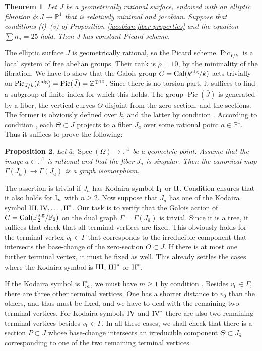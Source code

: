 \documentclass[oneside, 12pt]{amsart}
\newcommand\mylabel[1]{\label{#1}\marginpar{\vspace{-1ex}\medskip\medskip\footnotesize \tt #1}}
\renewcommand\mylabel[1]{\label{#1}}
\newtheorem{theorem}{Theorem}[section]
\newtheorem{proposition}[theorem]{Proposition}
\theoremstyle{definition}
\theoremstyle{remark}
\newcommand{\ZZ}{\mathbb{Z}}
\newcommand{\FF}{\mathbb{F}}
\newcommand{\PP}{\mathbb{P}}
\newcommand{\alg}{\text{\rm alg}}
\newcommand{\Gal}{\operatorname{Gal}}
\newcommand{\I}{\text{\rm I}}
\newcommand{\II}{\text{\rm II}}
\newcommand{\III}{\text{\rm III}}
\newcommand{\IV}{\text{\rm IV}}
\newcommand{\Pic}{\operatorname{Pic}}
\newcommand{\ra}{\rightarrow}
\newcommand{\Spec}{\operatorname{Spec}}
\newcommand{\bJ}{{\bar{J}}}
\newcommand{\ba}{{\bar{a}}}
\begin{document}
\begin{theorem}
\mylabel{constant pic}
Let $J$ be a geometrically rational surface, endowed with 
an elliptic fibration $\phi:J\ra\PP^1$ that is relatively minimal and jacobian.
Suppose that conditions {\rm (i)--(v)} of Proposition \ref{jacobian fiber properties} and the equation $\sum n_a=25$ hold.
Then $J$ has constant Picard scheme.
\end{theorem}

The elliptic surface $J$ is geometrically rational, so the Picard scheme $\Pic_{Y/k}$ is  a local system
of free abelian groups. Their  rank is $\rho=10$, by the minimality of the fibration.
We have to show that the Galois group $G=\Gal(k^\alg/k)$ acts trivially on $\Pic_{J/k}(k^\alg)=\Pic(\bJ)=\ZZ^{\oplus 10}$.
Since there is no torsion part, it suffices to find a subgroup of finite index for which this holds.
The group $\Pic(\bJ)$ is generated  by a fiber, the vertical curves $\Theta$ disjoint from the zero-section,
and the sections. The former is obviously defined over $k$, and the latter  by condition .
According to  condition , each $\Theta\subset\bJ$ projects to  a fiber $J_a$ over some rational point  $a\in\PP^1$. 
Thus it suffices to prove the following:

\begin{proposition}
\mylabel{bijection irreducible components}
Let $\ba:\Spec(\Omega)\ra \PP^1$ be a geometric point. Assume that the image $a\in \PP^1$ is rational
and that the fiber $J_a$ is singular. Then  the canonical map  $\Gamma(J_\ba)\ra \Gamma(J_a)$ 
is a graph isomorphism.
\end{proposition}

\proof
The assertion  is trivial if $J_\ba$ has Kodaira symbol $\I_1$ or $\II$.
Condition  ensures that it also holds for $\I_n$ with $n\geq 2$.
Now suppose that  $J_\ba$ has one of the Kodaira symbol $\III,\IV,\ldots,\II^*$.
Our task is to verify that the  Galois action of $G=\Gal(\FF_2^\alg/\FF_2)$ on the dual graph $\Gamma=\Gamma(J_\ba)$
is trivial.
Since it is a tree, it suffices that check that all terminal vertices are fixed.
This obviously holds for the terminal vertex $v_0\in\Gamma$ that corresponds to 
the irreducible component   that intersects the base-change of the zero-section $O\subset J$.
If there is at most one further terminal vertex, it must be fixed as well.
This already settles the cases where the Kodaira symbol is   $\III$, $\III^*$ or $\II^*$.

If the Kodaira symbol is $\I_m^*$, we must have $m\geq 1$ by condition .
Besides  $v_0\in\Gamma$, there are three other terminal vertices. One has a shorter distance
to $v_0$ than the others, and thus must be fixed, and we have to deal with the remaining two 
terminal vertices.
For  Kodaira symbols $\IV$ and $\IV^*$ there are also two remaining terminal vertices besides $v_0\in\Gamma$.
In all these cases, we shall check  that there is a section $P\subset J$ 
whose base-change intersects an irreducible component   $\Theta\subset J_\ba$
corresponding to one of the two remaining terminal vertices.
\end{document}

